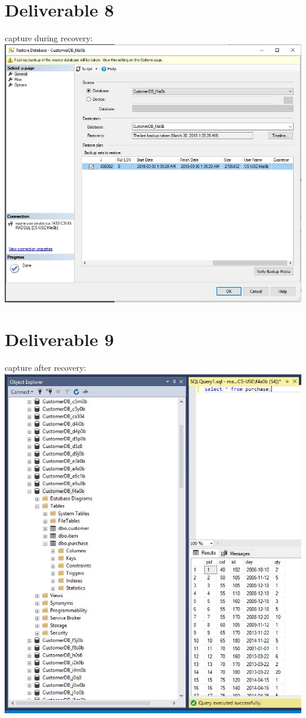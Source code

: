 \documentclass{article}
\begin{document}
\section{Deliverable 8}

capture during recovery: \\

\noindent \includegraphics[scale=0.7]{capture_during_recovery}


\section{Deliverable 9}

capture after recovery: \\

\noindent \includegraphics[scale=0.8]{capture_after_recovery}
\end{document}

